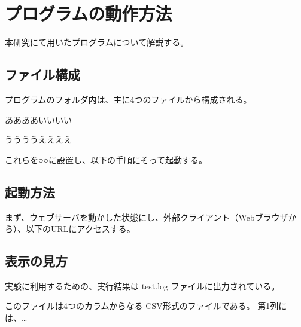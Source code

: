 \documentclass[a4paper,11pt,oneside,openany]{jsbook}
\begin{document}
\chapter{プログラムの動作方法}
本研究にて用いたプログラムについて解説する。

\section{ファイル構成}
プログラムのフォルダ内は、主に4つのファイルから構成される。

ああああいいいい

ううううええええ

これらを○○に設置し、以下の手順にそって起動する。

\section{起動方法}
まず、ウェブサーバを動かした状態にし、外部クライアント（Webブラウザから）、以下のURLにアクセスする。


\section{表示の見方}
実験に利用するための、実行結果は test.log ファイルに出力されている。

このファイルは4つのカラムからなる CSV形式のファイルである。
第1列には、…

%
\end{document}
